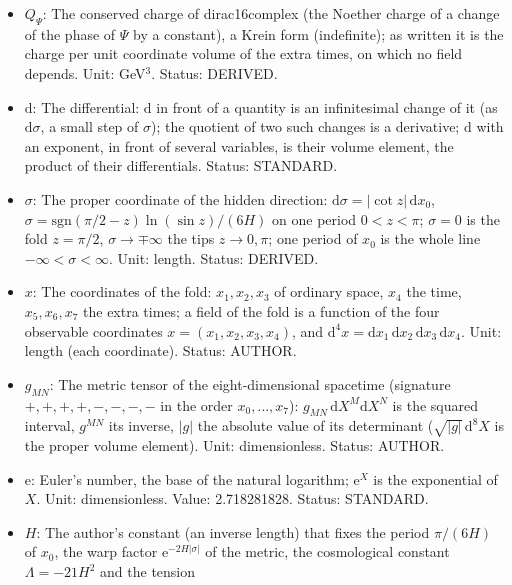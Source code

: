 \documentclass[
  10pt,
]{article}
\providecommand{\tightlist}{%
  \setlength{\itemsep}{0pt}\setlength{\parskip}{0pt}}
\begin{document}
\begin{itemize}
\tightlist
\item
  \(Q_\Psi\): The conserved charge of dirac16complex (the Noether charge
  of a change of the phase of \(\Psi\) by a constant), a Krein form
  (indefinite); as written it is the charge per unit coordinate volume
  of the extra times, on which no field depends. Unit: GeV\(^3\).
  Status: DERIVED.
\item
  \(\mathrm{d}\): The differential: \(\mathrm{d}\) in front of a
  quantity is an infinitesimal change of it (as \(\mathrm{d}\sigma\), a
  small step of \(\sigma\)); the quotient of two such changes is a
  derivative; \(\mathrm{d}\) with an exponent, in front of several
  variables, is their volume element, the product of their
  differentials. Status: STANDARD.
\item
  \(\sigma\): The proper coordinate of the hidden direction:
  \(\mathrm{d}\sigma = \lvert\cot z\rvert\,\mathrm{d}x_0\),
  \(\sigma = \mathrm{sgn}(\pi/2 - z)\ln(\sin z)/(6H)\) on one period
  \(0 < z < \pi\); \(\sigma = 0\) is the fold \(z = \pi/2\),
  \(\sigma \to \mp\infty\) the tips \(z \to 0, \pi\); one period of
  \(x_0\) is the whole line \(-\infty < \sigma < \infty\). Unit: length.
  Status: DERIVED.
\item
  \(x\): The coordinates of the fold: \(x_1, x_2, x_3\) of ordinary
  space, \(x_4\) the time, \(x_5, x_6, x_7\) the extra times; a field of
  the fold is a function of the four observable coordinates
  \(x = (x_1, x_2, x_3, x_4)\), and
  \(\mathrm{d}^4x = \mathrm{d}x_1\,\mathrm{d}x_2\,\mathrm{d}x_3\,\mathrm{d}x_4\).
  Unit: length (each coordinate). Status: AUTHOR.
\item
  \(g_{MN}\): The metric tensor of the eight-dimensional spacetime
  (signature \(+,+,+,+,-,-,-,-\) in the order \(x_0, \dots, x_7\)):
  \(g_{MN}\,\mathrm{d}X^M\mathrm{d}X^N\) is the squared interval,
  \(g^{MN}\) its inverse, \(\lvert g\rvert\) the absolute value of its
  determinant (\(\sqrt{\lvert g\rvert}\,\mathrm{d}^8X\) is the proper
  volume element). Unit: dimensionless. Status: AUTHOR.
\item
  \(\mathrm{e}\): Euler's number, the base of the natural logarithm;
  \(\mathrm{e}^{X}\) is the exponential of \(X\). Unit: dimensionless.
  Value: 2.718281828. Status: STANDARD.
\item
  \(H\): The author's constant (an inverse length) that fixes the period
  \(\pi/(6H)\) of \(x_0\), the warp factor
  \(\mathrm{e}^{-2H\lvert\sigma\rvert}\) of the metric, the cosmological
  constant \(\Lambda = -21H^2\) and the tension

\end{itemize}
\end{document}
